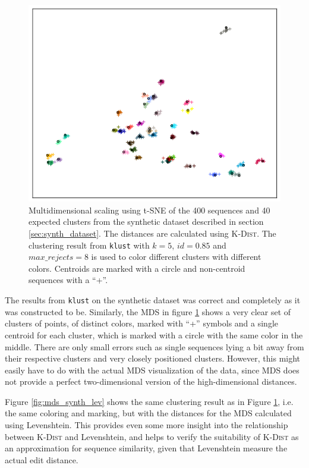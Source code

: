 \begin{figure}[h!]
  \includegraphics[width=\textwidth]{graphics/MDS_t-SNE_synth_silva_400.png}
  \caption{Multidimensional scaling using t-SNE of the 400 sequences and
    40 expected clusters from the synthetic dataset described in section
    \ref{sec:synth_dataset}. The distances are calculated using
    \textsc{K-Dist}. The clustering result from \texttt{klust} with $k=5$,
    $id=0.85$ and $max\_rejects=8$ is used to color different clusters with
    different colors. Centroids are marked with a circle and non-centroid
    sequences with a ``+''.}
  \label{fig:mds_synth}
\end{figure}

The results from \texttt{klust} on the synthetic dataset was correct and
completely as it was constructed to be. Similarly, the MDS in figure
\ref{fig:mds_synth} shows a very clear set of clusters of points, of distinct
colors, marked with ``+'' symbols and a single centroid for each cluster, which
is marked with a circle with the same color in the middle. There are only small
errors such as single sequences lying a bit away from their respective clusters
and very closely positioned clusters. However, this might easily have to do
with the actual MDS visualization of the data, since MDS does not provide a
perfect two-dimensional version of the high-dimensional distances.

Figure \ref{fig:mds_synth_lev} shows the same clustering result as in Figure
\ref{fig:mds_synth}, i.e. the same coloring and marking, but with the distances
for the MDS calculated using Levenshtein. This provides even some more insight
into the relationship between \textsc{K-Dist} and Levenshtein, and helps to
verify the suitability of \textsc{K-Dist} as an approximation for sequence
similarity, given that Levenshtein measure the actual edit distance.

